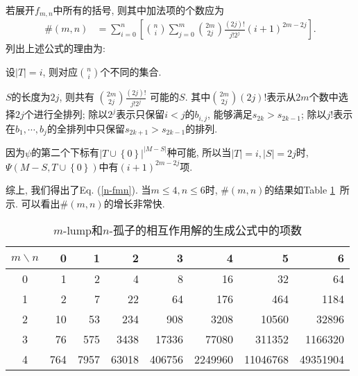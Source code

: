 \documentclass[12pt,a4paper,UTF8]{article}
\numberwithin{equation}{section}
\newcommand{\mbrace}[1]{\left[#1\right]}
\newcommand{\bbrace}[1]{\left\{#1\right\}}
\newcommand{\refeqn}[1]{Eq. (\ref{#1})}
\newcommand{\reftab}[1]{Table \ref{#1}~}
\newcommand{\MLNS}{$m$-lump和$n$-孤子的相互作用解}
\begin{document}
若展开$f_{m,n}$中所有的括号, 则其中加法项的个数应为
\begin{equation}
\begin{aligned}
\#(m,n)&=\sum_{i=0}^n\mbrace{\binom{n}{i}\sum_{j=0}^m{\binom{2m}{2j}\frac{(2j)!}{j!2^j}(i+1)^{2m-2j}}}. 
\end{aligned}
\label{n-fmn}
\end{equation}
列出上述公式的理由为:
\begin{compactitem}[\textbullet]
\item 设$|T|=i$, 则对应$\binom{n}{i}$个不同的集合.
\item $S$的长度为$2j$, 则共有 $\binom{2m}{2j}\frac{(2j)!}{j!2^j}$ 可能的$S$. 其中$\binom{2m}{2j}(2j)!$表示从$2m$个数中选择$2j$个进行全排列; 除以$2^j$表示只保留$i<j$的$b_{i,j}$, 能够满足$s_{2k}>s_{2k-1}$; 除以$j!$表示在$b_1,\cdots,b_j$的全排列中只保留$s_{2k+1}>s_{2k-1}$的排列. 
\item 因为$\psi$的第二个下标有$|T\cup \bbrace{0}|^{|M-S|}$种可能, 所以当$|T|=i,|S|=2j$时, $\Psi(M-S,T\cup\bbrace{0})$中有$(i+1)^{2m-2j}$项.
\end{compactitem}
综上, 我们得出了\refeqn{n-fmn}. 当$m\le 4, n\le 6$时, $\#(m,n)$的结果如\reftab{tb-n-fmn}所示. 可以看出$\#(m,n)$的增长非常快.

\begin{table}[htbp]
\centering 
\caption{\MLNS{}的生成公式中的项数} \label{tb-n-fmn}
\begin{tabular}{c|*{7}{r}}
\hline 
$m\backslash n$ & 0 & 1 & 2 & 3 & 4 & 5 & 6\\
\hline 
0 & 1 & 2 & 4 & 8 & 16 & 32 & 64 \\
1 & 2 & 7 & 22 & 64 & 176 & 464 & 1184 \\
2 & 10 & 53 & 234 & 908 & 3208 & 10560 & 32896 \\
3 & 76 & 575 & 3438 & 17336 & 77080 & 311352 & 1166320 \\
4 & 764 & 7957 & 63018 & 406756 & 2249960 & 11046768 & 49351904 \\
\hline 
\end{tabular}
\end{table}
\end{document}
